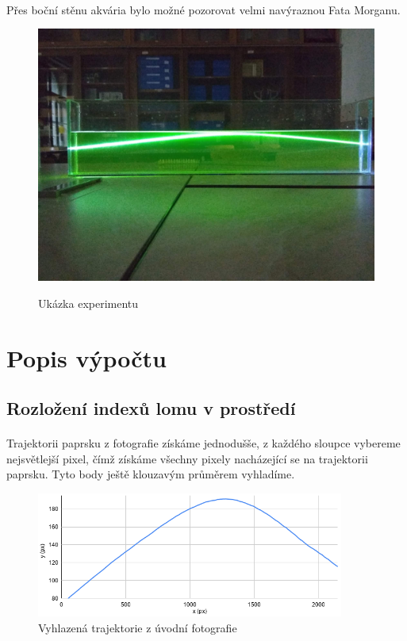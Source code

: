 \documentclass[10pt,a4paper]{article}
\begin{document}
\paragraph{}
Přes boční stěnu akvária bylo možné pozorovat velmi navýraznou Fata Morganu.


\begin{figure}[H]
\centering
    \includegraphics[width=\textwidth]{ukazkaAkvarko.jpg}
    \label{fig:uvod}
    \caption{Ukázka experimentu}
\end{figure}

\newpage

\section{Popis výpočtu}

\subsection{Rozložení indexů lomu v prostředí}

\paragraph{}
Trajektorii paprsku z fotografie získáme jednodušše, z každého sloupce vybereme nejsvětlejší pixel, čímž získáme všechny pixely nacházející se na trajektorii paprsku. Tyto body ještě klouzavým průměrem vyhladíme.


\begin{figure}[H]
\centering
    \includegraphics[width=0.9\textwidth]{chart.png}
    \caption{Vyhlazená trajektorie z úvodní fotografie}
    \label{fig:chart1}
\end{figure}
\end{document}
